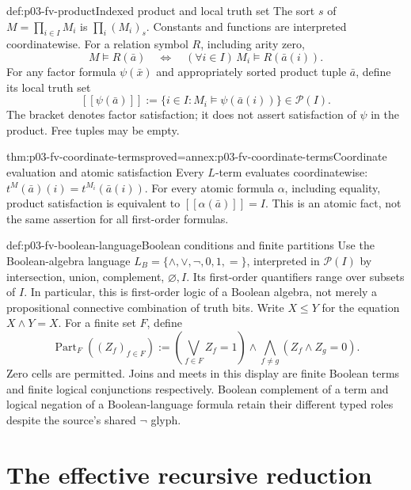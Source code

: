 \begin{hbdefinition}{def:p03-fv-product}{Indexed product and local truth set}
The sort \(s\) of \(M=\prod_{i\in I}M_i\) is
\(\prod_i(M_i)_s\). Constants and functions are interpreted coordinatewise.
For a relation symbol \(R\), including arity zero,
\[
 M\models R(\bar a)\quad\Longleftrightarrow\quad
          (\forall i\in I)\,M_i\models R(\bar a(i)).
\]
For any factor formula \(\psi(\bar x)\) and appropriately sorted product
tuple \(\bar a\), define its local truth set
\[
 [\![\psi(\bar a)]\!]:=
           \{i\in I:M_i\models\psi(\bar a(i))\}\in\mathcal P(I).
\]
The bracket denotes factor satisfaction; it does not assert satisfaction
of \(\psi\) in the product. Free tuples may be empty.
\end{hbdefinition}

\begin{hblemma}{thm:p03-fv-coordinate-terms}{proved=annex:p03-fv-coordinate-terms}{Coordinate evaluation and atomic satisfaction}
Every \(L\)-term evaluates coordinatewise:
\(t^M(\bar a)(i)=t^{M_i}(\bar a(i))\). For every atomic formula
\(\alpha\), including equality, product satisfaction is equivalent to
\([\![\alpha(\bar a)]\!]=I\). This is an atomic fact, not the same
assertion for all first-order formulas.
\end{hblemma}

\begin{hbdefinition}{def:p03-fv-boolean-language}{Boolean conditions and finite partitions}
Use the Boolean-algebra language \(L_B=\{\wedge,\vee,\neg,0,1,=\}\),
interpreted in \(\mathcal P(I)\) by intersection, union, complement,
\(\varnothing,I\). Its first-order quantifiers range over subsets of \(I\).
In particular, this is first-order logic of a Boolean algebra, not merely
a propositional connective combination of truth bits. Write
\(X\le Y\) for the equation \(X\wedge Y=X\).
For a finite set \(F\), define
\[
 \operatorname{Part}_F((Z_f)_{f\in F})
 :=\left(\bigvee_{f\in F}Z_f=1\right)
       \land\bigwedge_{f\ne g}(Z_f\wedge Z_g=0).
\]
Zero cells are permitted. Joins and meets in this display are finite Boolean
terms and finite logical conjunctions respectively. Boolean complement of
a term and logical negation of a Boolean-language formula retain their
different typed roles despite the source's shared \(\neg\) glyph.
\end{hbdefinition}

\section{The effective recursive reduction}

